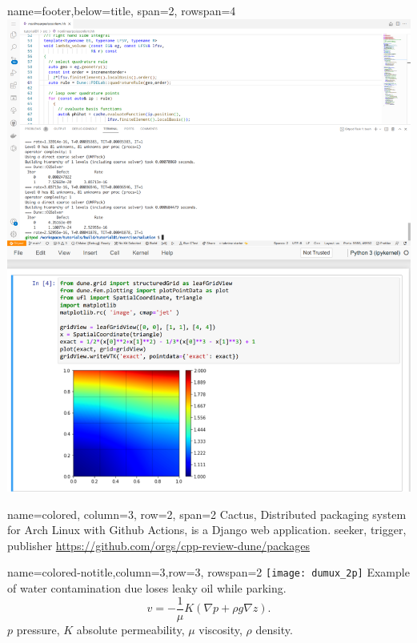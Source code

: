 \documentclass[
	paper=a0,
	style=ruled, %
	]{bfhsciposter}
\begin{document}
\begin{tcbposter}[
		poster={
				columns=4,
				rows=7,
				spacing=1cm,
			},]
	\begin{posterboxenv}[BFH-framed,title=Tutorials available on Gitpod]{name=footer,below=title, span=2, rowspan=4}
		\includegraphics[width=\linewidth]{gitpod_dune}
	\end{posterboxenv}

	\begin{posterboxenv}[title=C++ Review DUNE meets Arch Linux Repository for Education, BFH-framed]{name=colored, column=3, row=2, span=2}
		Cactus, Distributed packaging system for Arch Linux with Github Actions, is a Django web application.
		seeker, trigger, publisher
		\url{https://github.com/orgs/cpp-review-dune/packages}
	\end{posterboxenv}

	\begin{posterboxenv}{name=colored-notitle,column=3,row=3, rowspan=2}
		\texttt{[image: dumux\_2p]}
		Example of water contamination due loses leaky oil while parking.
		\[
			v=
			-\frac{1}{\mu}
			K
			\left(\nabla p+\rho g \nabla z\right).
		\]
		$p$ pressure, $K$ absolute permeability,
		$\mu$ viscosity, $\rho$ density.
	\end{posterboxenv}


\end{tcbposter}
\end{document}

